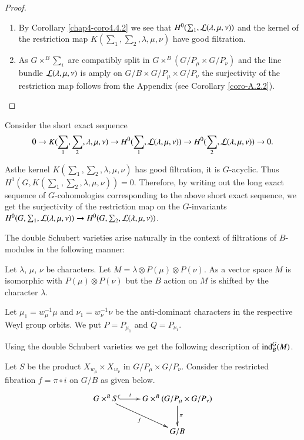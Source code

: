\begin{proof}
\begin{enumerate}
\renewcommand{\theenumi}{\roman{enumi}}
\renewcommand{\labelenumi}{\rm(\theenumi)}
\item By Corollary \ref{chap4-coro4.4.2} we see that
  $H^{0}(\sum_{1},\mathcal{L}(\lambda,\mu,\nu))$ and the kernel of the
  restriction map $K(\sum_{1},\sum_{2},\lambda,\mu,\nu)$ have good
  filtration. 

\item As $G\times^{B}\sum_{i}$ are compatibly split in
  $G\times^{B}(G/P_{\mu}\times G/P_{\nu})$ and the line bundle
  $\mathcal{L}(\lambda,\mu,\nu)$ is amply on $G/B\times G/P_{\mu}\times
  G/P_{\nu}$ the surjectivity of the restriction map follows from the
  Appendix (see Corollary \ref{coro-A.2.2}).
\end{enumerate}
\end{proof}

\begin{remark}\label{chap5-rem5.1.4}
Consider the short exact sequence
{\fontsize{10pt}{12pt}\selectfont
$$
0\to K(\sum_{1},\sum_{2},\lambda,\mu,\nu)\to
H^{0}(\sum_{1},\mathcal{L}(\lambda,\mu,\nu))\to
H^{0}(\sum_{2},\mathcal{L}(\lambda,\mu,\nu))\to 0.
$$}\relax

As\pageoriginale the\label{page50} kernel $K(\sum_{1},\sum_{2},\lambda,\mu,\nu)$ has
good filtration, it is $G$-acyclic. Thus
$H^{1}(G,K(\sum_{1},\sum_{2},\lambda,\mu,\nu))=0$. Therefore, by
writing out the long exact sequence of $G$-cohomologies corresponding
to the above short exact sequence, we get the surjectivity of the
restriction map on the $G$-invariants
$H^{0}(G,\sum_{1},\mathcal{L}(\lambda,\mu,\nu))\to
H^{0}(G,\sum_{2},\mathcal{L}(\lambda,\mu,\nu))$. 
\end{remark}

The double Schubert varieties arise naturally in the context of
filtrations of $B$-modules in the following manner:

Let $\lambda$, $\mu$, $\nu$ be characters. Let $M=\lambda\otimes
P(\mu)\otimes P(\nu)$. As a vector space $M$ is isomorphic with
$P(\mu)\otimes P(\nu)$ but the $B$ action on $M$ is shifted by the
character $\lambda$.

Let $\mu_{1}=w^{-1}_{\mu}\mu$ and $\nu_{1}=w^{-1}_{\nu}\nu$ be the
anti-dominant characters in the respective Weyl group orbits. We put
$P=P_{\mu_{1}}$ and $Q=P_{\nu_{1}}$.

Using the double Schubert varieties we get the following description
of $\operatorname{ind}^{G}_{B}(M)$.

Let $S$ be the product $X_{w_{\mu}}\times X_{w_{\nu}}$ in
$G/P_{\mu}\times G/P_{\nu}$. Consider the restricted fibration
$f=\pi\circ i$ on $G/B$ as given below.
\[
\xymatrix{
G\times^{B}S \ar@{^(->}[r]^-{i}\ar[dr]_{f}  &
G\times^{B}(G/P_{\mu}\times G/P_{\nu})\ar[d]^{\pi} \\
 & G/B
}
\]

